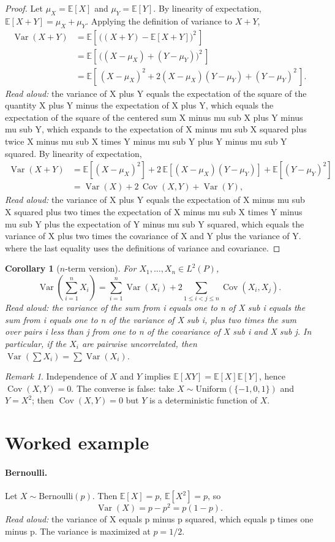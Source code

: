 \documentclass[11pt]{article}
\newtheorem{corollary}[theorem]{Corollary}
\theoremstyle{definition}
\theoremstyle{remark}
\newtheorem*{remark}{Remark}
\DeclareMathOperator{\Var}{Var}
\DeclareMathOperator{\Cov}{Cov}
\newcommand{\E}{\mathbb{E}}
\begin{document}
\begin{proof}
Let $\mu_X = \E[X]$ and $\mu_Y = \E[Y]$. By linearity of expectation,
$\E[X + Y] = \mu_X + \mu_Y$. Applying the definition of variance to $X + Y$,
\begin{align*}
\Var(X + Y)
  &= \E\!\left[\,\big((X + Y) - \E[X + Y]\big)^2\,\right] \\
  &= \E\!\left[\,\big((X - \mu_X) + (Y - \mu_Y)\big)^2\,\right] \\
  &= \E\!\left[\,(X - \mu_X)^2 + 2(X - \mu_X)(Y - \mu_Y) + (Y - \mu_Y)^2\,\right].
\end{align*}
\emph{Read aloud:} the variance of X plus Y equals the expectation of the square of the quantity X plus Y minus the expectation of X plus Y, which equals the expectation of the square of the centered sum X minus mu sub X plus Y minus mu sub Y, which expands to the expectation of X minus mu sub X squared plus twice X minus mu sub X times Y minus mu sub Y plus Y minus mu sub Y squared.
By linearity of expectation,
\begin{align*}
\Var(X + Y)
  &= \E\!\left[(X - \mu_X)^2\right]
   + 2\,\E\!\left[(X - \mu_X)(Y - \mu_Y)\right]
   + \E\!\left[(Y - \mu_Y)^2\right] \\
  &= \Var(X) + 2\,\Cov(X, Y) + \Var(Y),
\end{align*}
\emph{Read aloud:} the variance of X plus Y equals the expectation of X minus mu sub X squared plus two times the expectation of X minus mu sub X times Y minus mu sub Y plus the expectation of Y minus mu sub Y squared, which equals the variance of X plus two times the covariance of X and Y plus the variance of Y.
where the last equality uses the definitions of variance and covariance.
\end{proof}

\begin{corollary}[$n$-term version]
For $X_1, \dots, X_n \in L^2(P)$,
\[
\Var\!\left(\sum_{i=1}^n X_i\right)
  = \sum_{i=1}^n \Var(X_i) + 2\!\!\sum_{1 \le i < j \le n}\!\! \Cov(X_i, X_j).
\]
\emph{Read aloud:} the variance of the sum from i equals one to n of X sub i equals the sum from i equals one to n of the variance of X sub i, plus two times the sum over pairs i less than j from one to n of the covariance of X sub i and X sub j.
In particular, if the $X_i$ are pairwise uncorrelated, then
$\Var(\sum X_i) = \sum \Var(X_i)$.
\end{corollary}

\begin{remark}
Independence of $X$ and $Y$ implies $\E[XY] = \E[X]\E[Y]$, hence
$\Cov(X, Y) = 0$. The converse is false: take $X \sim \text{Uniform}(\{-1, 0, 1\})$
and $Y = X^2$; then $\Cov(X, Y) = 0$ but $Y$ is a deterministic function of $X$.
\end{remark}

\section{Worked example}

\paragraph{Bernoulli.} Let $X \sim \mathrm{Bernoulli}(p)$. Then $\E[X] = p$,
$\E[X^2] = p$, so
\[
\Var(X) = p - p^2 = p(1 - p).
\]
\emph{Read aloud:} the variance of X equals p minus p squared, which equals p times one minus p.
The variance is maximized at $p = 1/2$.
\end{document}
